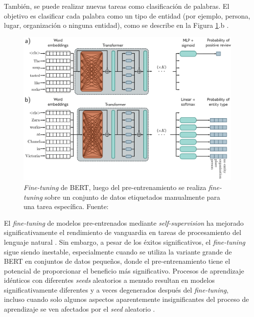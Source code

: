También, se puede realizar nuevas tareas como clasificación de palabras. El objetivo es clasificar cada palabra como un tipo de entidad (por ejemplo, persona, lugar, organización o ninguna entidad), como se describe en la Figura \ref{fig:bert2}.b \citep{prince2023understanding}.

\begin{figure}[H]
	\centering
	\includegraphics[width=\textwidth]{../img/theory/pre-training2}
	\caption[\textit{Fine-tuning} de BERT]{\textit{Fine-tuning} de BERT, luego del pre-entrenamiento se realiza \textit{fine-tuning} sobre un conjunto de datos etiquetados manualmente para una tarea específica. Fuente: \cite{prince2023understanding}}
	\label{fig:bert2}
\end{figure}


El \textit{fine-tuning} de modelos pre-entrenados mediante \textit{self-supervision} ha mejorado significativamente el rendimiento de vanguardia en tareas de procesamiento del lenguaje natural \citep{zhang2020revisiting}. Sin embargo, a pesar de los éxitos significativos, el \textit{fine-tuning} sigue siendo inestable, especialmente cuando se utiliza la variante grande de BERT en conjuntos de datos pequeños, donde el pre-entrenamiento tiene el potencial de proporcionar el beneficio más significativo. Procesos de aprendizaje idénticos con diferentes \textit{seeds} aleatorios a menudo resultan en modelos significativamente diferentes y a veces degenerados después del \textit{fine-tuning}, incluso cuando solo algunos aspectos aparentemente insignificantes del proceso de aprendizaje se ven afectados por el \textit{seed} aleatorio  \citep{zhang2020revisiting,prince2023understanding}.

